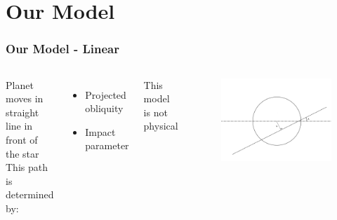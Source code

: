 \documentclass[show notes]{beamer}
\begin{document}

\section{Our Model}

\begin{frame}
\frametitle{Our Model - Linear}
\begin{columns}
		Planet moves in straight line in front of the star\\
		
		This path is determined by:
		\begin{itemize}
			\item Projected obliquity
			\item Impact parameter
		\end{itemize}
		
		This model is not physical
		
	\begin{figure}
	\centering
	\includegraphics[width=\textwidth]{../figures/linear_model.png}
	\end{figure}		
	
\end{columns}
\end{frame}
\end{document}
